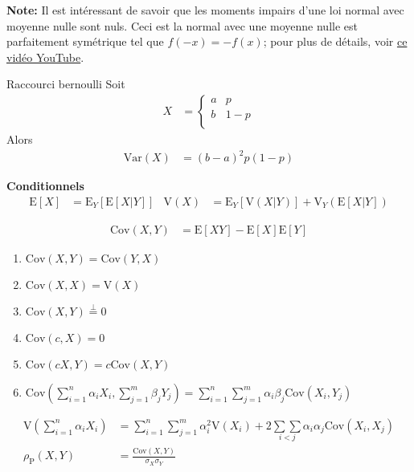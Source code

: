 \documentclass[10pt, french]{article}
\begin{document}
\begin{multicols*}{2}
\textbf{Note: } Il est intéressant de savoir que les moments impairs d'une loi normal avec moyenne nulle sont nuls.
Ceci est la normal avec une moyenne nulle est parfaitement symétrique tel que $f(-x) = -f(x)$; pour plus de détails, voir \href{https://www.youtube.com/watch?v=V4CjFT0k-_E}{ce vidéo YouTube}.

\begin{rappel}{Raccourci bernoulli}
Soit 
\begin{align*}
	X
	&=	\begin{cases}
		a	&	p	\\
		b	&	1 - p	\\
		\end{cases}
\end{align*}
Alors
\begin{align*}
	\text{Var}(X)	
	&=	(b - a)^{2}p (1 - p)
\end{align*}
\end{rappel}

\textbf{Conditionnels}
\begin{align*}
	\text{E}[X]	&=	\text{E}_{Y}[\text{E}[X|Y]]	&
	\text{V}(X)	&=	\text{E}_{Y}[\text{V}(X|Y)] + \text{V}_{Y}(\text{E}[X|Y])
\end{align*}

\begin{align*}
	\text{Cov}(X, Y)	
		&=	\text{E}[XY] - \text{E}[X] \text{E}[Y]	
\end{align*}

\begin{enumerate}
	\item $\text{Cov}(X, Y) = \text{Cov}(Y, X)$
	\item $\text{Cov}(X, X) = \text{V}(X)$
	\item $\text{Cov}(X, Y) \overset{\bot}{=} 0$
	\item $\text{Cov}(c, X) = 0$
	\item $\text{Cov}(cX, Y) = c\text{Cov}(X, Y)$
	\item $\text{Cov}(\sum_{i = 1}^{n}\alpha_{i} X_{i}, \sum_{j = 1}^{m}\beta_{j} Y_{j}) = \sum_{i = 1}^{n}\sum_{j = 1}^{m}\alpha_{i}\beta_{j}  \text{Cov}(X_{i}, Y_{j})$
\end{enumerate}

\begin{align*}
	\text{V}(\sum_{i = 1}^{n}\alpha_{i} X_{i}) 
		&= \sum_{i = 1}^{n}\sum_{j = 1}^{m}\alpha_{i}^{2}\text{V}(X_{i}) + 2 \underset{i < j}{\sum\sum} \alpha_{i}\alpha_{j} \text{Cov}(X_{i}, X_{j})	\\
	\rho_{\textrm{P}}(X, Y)
		&=	\frac{\text{Cov}(X, Y)}{\sigma_{X}\sigma_{Y}}
\end{align*}


\end{multicols*}
\end{document}
